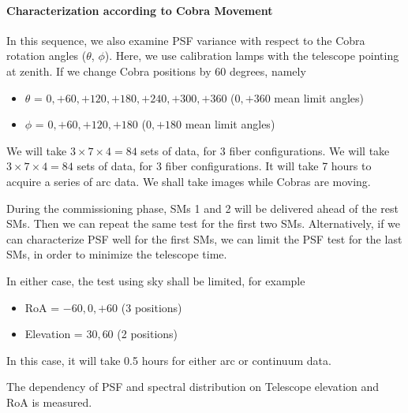 \paragraph{Characterization according to Cobra Movement}
In this sequence, we also examine PSF variance with respect to the Cobra rotation angles ($\theta$, $\phi$).
Here, we use calibration lamps with the telescope pointing at zenith.
If we change Cobra positions by 60 degrees, namely
\begin{itemize}
\item $\theta$ = $0, +60, +120, +180, +240, +300, +360$ ($0, +360$ mean limit angles)
\item $\phi$ = $0, +60, +120, +180$ ($0, +180$ mean limit angles)
\end{itemize}
We will take $3 \times 7 \times 4 = 84$ sets of data, for 3 fiber configurations.
We will take $3 \times 7 \times 4 = 84$ sets of data, for 3 fiber configurations.
It will take 7 hours to acquire a series of arc data.
We shall take images while Cobras are moving.

\bigskip

During the commissioning phase, SMs 1 and 2 will be delivered ahead of the rest SMs.
Then we can repeat the same test for the first two SMs.
Alternatively, if we can characterize PSF well for the first SMs, we can limit the PSF test for the last SMs, in order to minimize the telescope time.

In either case, the test using sky shall be limited, for example
\begin{itemize}
\item RoA = $-60, 0, +60$ (3 positions)
\item Elevation = $30, 60$ (2 positions)
\end{itemize}
In this case, it will take 0.5 hours for either arc or continuum data.


\begin{itembox}[l]{}
The dependency of PSF and spectral distribution on Telescope elevation and RoA is measured.

\end{itembox}